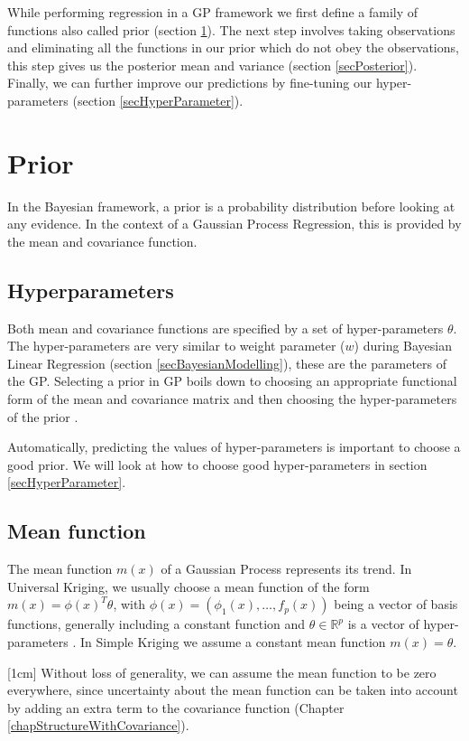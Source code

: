 While performing regression in a GP framework we first define a family of functions also called prior (section \ref{secPrior}). The next step involves taking observations and eliminating all the functions in our prior which do not obey the observations, this step gives us the posterior mean and variance (section \ref{secPosterior}). Finally, we can further improve our predictions by fine-tuning our hyper-parameters (section \ref{secHyperParameter}).

\section{Prior} \label{secPrior}
In the Bayesian framework, a prior is a probability distribution before looking at any evidence. In the context of a Gaussian Process Regression, this is provided by the mean and covariance function. 

\subsection{Hyperparameters}
Both mean and covariance functions are specified by a set of hyper-parameters \(\theta\). The hyper-parameters are very similar to weight parameter (\(w\)) during Bayesian Linear Regression (section \ref{secBayesianModelling}), these are the parameters of the GP. Selecting a prior in GP boils down to choosing an appropriate functional form of the mean and covariance matrix and then choosing the hyper-parameters of the prior \cite{duvenaud2013structure}. 

Automatically, predicting the values of hyper-parameters is important to choose a good prior. We will look at how to choose good hyper-parameters in section \ref{secHyperParameter}. 

\subsection{Mean function}
The mean function \(m(x)\) of a Gaussian Process represents its trend. In Universal Kriging, we usually choose a mean function of the form \(m(x) = \phi(x)^{T}\theta\), with \(\phi(x) = (\phi_{1}(x), \ldots , f_{p}(x))\) being a vector of basis functions, generally including a constant function and \(\theta \in \mathbb{R}^{p}\) is a vector of hyper-parameters \cite{matheron1963principles}. In Simple Kriging we assume a constant mean function \(m(x) = \theta\).

[1cm]
Without loss of generality, we can assume the mean function to be zero everywhere, since uncertainty about the mean function can be taken into account by adding an extra term to the covariance function (Chapter \ref{chapStructureWithCovariance}).  

